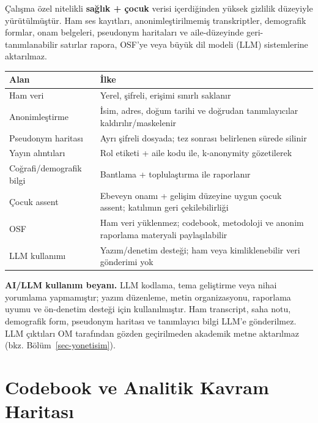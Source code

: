 \documentclass[
  turkish,
  a4paper,
  DIV=11,
  numbers=noendperiod]{scrreprt}
\newcounter{none} %
\begin{document}
Çalışma özel nitelikli \textbf{sağlık + çocuk} verisi içerdiğinden
yüksek gizlilik düzeyiyle yürütülmüştür. Ham ses kayıtları,
anonimleştirilmemiş transkriptler, demografik formlar, onam belgeleri,
pseudonym haritaları ve aile-düzeyinde geri-tanımlanabilir satırlar
rapora, OSF'ye veya büyük dil modeli (LLM) sistemlerine aktarılmaz.

{\def\LTcaptype{none} %
\begin{longtable}[]{@{}
  >{\raggedright\arraybackslash}p{}
  >{\raggedright\arraybackslash}p{}@{}}
\toprule\noalign{}
\begin{minipage}[b]{\linewidth}\raggedright
Alan
\end{minipage} & \begin{minipage}[b]{\linewidth}\raggedright
İlke
\end{minipage} \\
\midrule\noalign{}
\endhead
\bottomrule\noalign{}
\endlastfoot
Ham veri & Yerel, şifreli, erişimi sınırlı saklanır \\
Anonimleştirme & İsim, adres, doğum tarihi ve doğrudan tanımlayıcılar
kaldırılır/maskelenir \\
Pseudonym haritası & Ayrı şifreli dosyada; tez sonrası belirlenen sürede
silinir \\
Yayın alıntıları & Rol etiketi + aile kodu ile, k-anonymity
gözetilerek \\
Coğrafi/demografik bilgi & Bantlama + toplulaştırma ile raporlanır \\
Çocuk assent & Ebeveyn onamı + gelişim düzeyine uygun çocuk assent;
katılımın geri çekilebilirliği \\
OSF & Ham veri yüklenmez; codebook, metodoloji ve anonim raporlama
materyali paylaşılabilir \\
LLM kullanımı & Yazım/denetim desteği; ham veya kimliklenebilir veri
gönderimi yok \\
\end{longtable}
}

\textbf{AI/LLM kullanım beyanı.} LLM kodlama, tema geliştirme veya nihai
yorumlama yapmamıştır; yazım düzenleme, metin organizasyonu, raporlama
uyumu ve ön-denetim desteği için kullanılmıştır. Ham transcript, saha
notu, demografik form, pseudonym haritası ve tanımlayıcı bilgi LLM'e
gönderilmez. LLM çıktıları OM tarafından gözden geçirilmeden akademik
metne aktarılmaz (bkz. Bölüm~\ref{sec-yonetisim}).

\chapter{Codebook ve Analitik Kavram Haritası}\label{sec-codebook}
\end{document}
